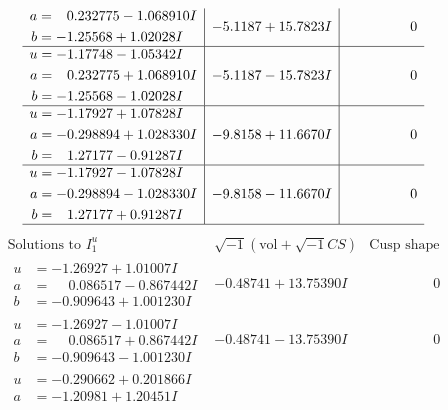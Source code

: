 \documentclass[1p]{elsarticle_modified}
\theoremstyle{definition}
\newcommand{\I}{\sqrt{-1}}
\begin{document}
$$\begin{array}{c|c|c}
\begin{aligned}
a &= \phantom{-}0.232775 - 1.068910 I \\
b &= -1.25568 + 1.02028 I\end{aligned}
 & -5.1187 + 15.7823 I & \phantom{-0.000000 } 0 \\ \hline\begin{aligned}
u &= -1.17748 - 1.05342 I \\
a &= \phantom{-}0.232775 + 1.068910 I \\
b &= -1.25568 - 1.02028 I\end{aligned}
 & -5.1187 - 15.7823 I & \phantom{-0.000000 } 0 \\ \hline\begin{aligned}
u &= -1.17927 + 1.07828 I \\
a &= -0.298894 + 1.028330 I \\
b &= \phantom{-}1.27177 - 0.91287 I\end{aligned}
 & -9.8158 + 11.6670 I & \phantom{-0.000000 } 0 \\ \hline\begin{aligned}
u &= -1.17927 - 1.07828 I \\
a &= -0.298894 - 1.028330 I \\
b &= \phantom{-}1.27177 + 0.91287 I\end{aligned}
 & -9.8158 - 11.6670 I & \phantom{-0.000000 } 0\\
 \hline 
 \end{array}$$\newpage$$\begin{array}{c|c|c}  
\text{Solutions to }I^u_{1}& \I (\text{vol} + \sqrt{-1}CS) & \text{Cusp shape}\\
 \hline 
\begin{aligned}
u &= -1.26927 + 1.01007 I \\
a &= \phantom{-}0.086517 - 0.867442 I \\
b &= -0.909643 + 1.001230 I\end{aligned}
 & -0.48741 + 13.75390 I & \phantom{-0.000000 } 0 \\ \hline\begin{aligned}
u &= -1.26927 - 1.01007 I \\
a &= \phantom{-}0.086517 + 0.867442 I \\
b &= -0.909643 - 1.001230 I\end{aligned}
 & -0.48741 - 13.75390 I & \phantom{-0.000000 } 0 \\ \hline\begin{aligned}
u &= -0.290662 + 0.201866 I \\
a &= -1.20981 + 1.20451 I \\

\end{aligned}
\end{array}$$
\end{document}

